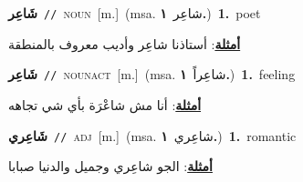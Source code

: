 \documentclass[10pt,a4paper,twoside]{article} %
\begin{document}
\begin{multicols}{2}
{\setlength\topsep{0pt}\textbf{\foreignlanguage{arabic}{شَاعِر}}\ {\color{gray}\texttt{//}\color{black}}\ \textsc{noun}\ [m.]\ \color{gray}(msa. \foreignlanguage{arabic}{شاعِر}~\foreignlanguage{arabic}{\textbf{١.}})\color{black}\ \textbf{1.}~poet\  \begin{flushright}\color{gray}\foreignlanguage{arabic}{\textbf{\underline{\foreignlanguage{arabic}{أمثلة}}}: أستاذنا شاعِر وأديب معروف بالمنطقة}\end{flushright}\color{black}} \vspace{2mm}

{\setlength\topsep{0pt}\textbf{\foreignlanguage{arabic}{شَاعِر}}\ {\color{gray}\texttt{//}\color{black}}\ \textsc{noun\textunderscore act}\ [m.]\ \color{gray}(msa. \foreignlanguage{arabic}{شاعِراً}~\foreignlanguage{arabic}{\textbf{١.}})\color{black}\ \textbf{1.}~feeling\  \begin{flushright}\color{gray}\foreignlanguage{arabic}{\textbf{\underline{\foreignlanguage{arabic}{أمثلة}}}: أنا مش شاعْرَة بأي شي تجاهه}\end{flushright}\color{black}} \vspace{2mm}

{\setlength\topsep{0pt}\textbf{\foreignlanguage{arabic}{شَاعِري}}\ {\color{gray}\texttt{//}\color{black}}\ \textsc{adj}\ [m.]\ \color{gray}(msa. \foreignlanguage{arabic}{شاعِري}~\foreignlanguage{arabic}{\textbf{١.}})\color{black}\ \textbf{1.}~romantic\  \begin{flushright}\color{gray}\foreignlanguage{arabic}{\textbf{\underline{\foreignlanguage{arabic}{أمثلة}}}: الجو شاعِري وجميل والدنيا صبابا}\end{flushright}\color{black}} \vspace{2mm}


\end{multicols}
\end{document}
